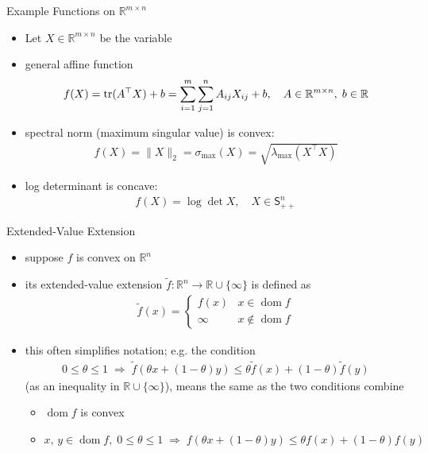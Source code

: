 \documentclass[10pt]{beamer}
\newcommand{\ds}{\displaystyle}
\newcommand{\ie}{\;\Longrightarrow\;}
\DeclareMathOperator*{\dom}{dom}
\DeclareMathOperator*{\tr}{tr}
\theoremstyle{definition}
\def\tr{\mathop{\rm tr}}
\begin{document}
\begin{frame}{Example Functions on $\mathbb{R}^{m\times n}$}

\begin{itemize}
  \item Let $\ds X\in\mathbb{R}^{m\times n}$ be the variable
  \item general affine function
    \begin{align*}
      f(X) = \tr(A^\top X) + b = \sum_{i=1}^m\sum_{j=1}^n A_{ij} X_{ij} + b, \quad A\in\mathbb{R}^{m\times n},\;b\in\mathbb{R}
    \end{align*}
  \item spectral norm (maximum singular value) is convex: 
    \begin{align*}
      f(X) = \|X\|_2 = \sigma_{\text{max}}(X) = \sqrt{\lambda_{\text{max}}(X^\top X)}
    \end{align*}
  \item log determinant is concave:
    \begin{align*}
      f(X) = \log\det X, \quad X\in\mathsf{S}^n_{++}
    \end{align*}
\end{itemize}
\end{frame}

\begin{frame}{Extended-Value Extension}
  \begin{itemize}
    \item suppose $f$ is convex on $\mathbb{R}^n$
    \item its extended-value extension $\ds\widetilde{f}: \mathbb{R}^n\to\mathbb{R}\cup\{\infty\}$ is defined as
      \begin{align*}
        \widetilde{f}(x) = \begin{cases}f(x) & x\in\dom f \\ \infty & x\not\in\dom f\end{cases} 
      \end{align*}
    \item this often simplifies notation; e.g. the condition 
      \begin{align*}
        0\leqslant\theta\leqslant 1\ie\widetilde{f}(\theta x + (1 - \theta) y)\leqslant\theta\widetilde{f}(x) + (1 - \theta)\widetilde{f}(y)
      \end{align*}
      (as an inequality in $\mathbb{R}\cup\{\infty\}$), means the same as the two conditions combine
      \begin{itemize}
        \item $\dom f$ is convex
        \item $x,\,y\in\dom f,\;0\leqslant\theta\leqslant 1 \ie f(\theta x + (1 - \theta)y)\leqslant\theta f(x) + (1 - \theta) f(y)$
      \end{itemize}
  \end{itemize}
\end{frame}
\end{document}
